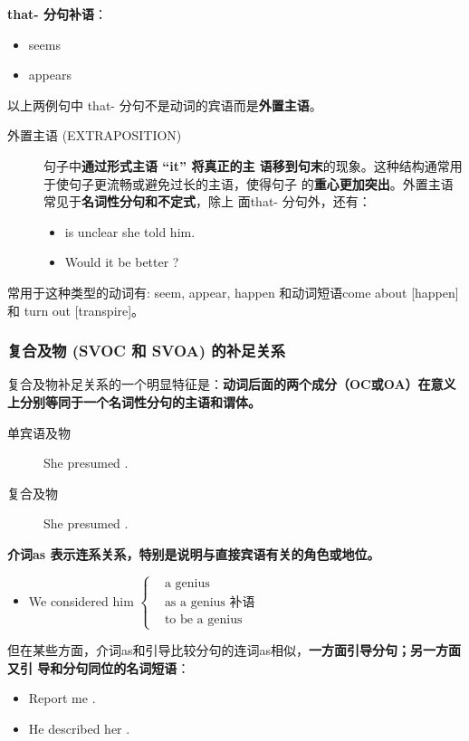 \textbf{that- 分句补语}：
\begin{itemize}
\item {} seems 
\item {} appears 
\end{itemize}
以上两例句中 that- 分句不是动词的宾语而是\textbf{外置主语}。
\begin{description}
\item[外置主语 (EXTRAPOSITION)] 句子中\textbf{通过形式主语 “it” 将真正的主
    语移到句末}的现象。这种结构通常用于使句子更流畅或避免过长的主语，使得句子
  的\textbf{重心更加突出}。外置主语常见于\textbf{名词性分句和不定式}，除上
  面that- 分句外，还有：
  \begin{itemize}
  \item {} is unclear  she told him.

  \item Would it be better ?
  \end{itemize}
\end{description}
常用于这种类型的动词有: seem, appear, happen 和动词短语come about
[happen]和 turn out [transpire]。

\subsubsection{复合及物 (SVOC 和 SVOA) 的补足关系}

复合及物补足关系的一个明显特征是：\textbf{动词后面的两个成分（OC或OA）在意义
  上分别等同于一个名词性分句的主语和谓体。}
\begin{description}
\item[单宾语及物] She presumed .
\item[复合及物] She presumed .
\end{description}

\textbf{介词as 表示连系关系，特别是说明与直接宾语有关的角色或地位。}
\begin{itemize}
\item We considered him $ \left\{
    \begin{aligned}
      &\text{a genius} \\
      &\text{as a genius 补语} \\
      &\text{to be a genius}
    \end{aligned}
  \right. $
\end{itemize}
但在某些方面，介词as和引导比较分句的连词as相似，\textbf{一方面引导分句；另一方面又引
导和分句同位的名词短语}：
\begin{itemize}
\item Report me .

\item He described her .
\end{itemize}


